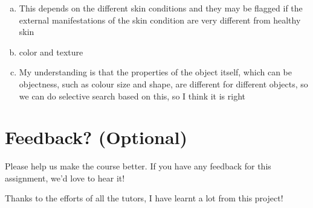  \begin{enumerate}[(a)]

 \item This depends on the different skin conditions and they may be flagged if the external manifestations of the skin condition are very different from healthy skin

 \item color and texture

 \item My understanding is that the properties of the object itself, which can be objectness, such as colour size and shape, are different for different objects, so we can do selective search based on this, so I think it is right

 \end{enumerate}



\pagebreak
\section*{Feedback? (Optional)}
Please help us make the course better. If you have any feedback for this assignment, we'd love to hear it!

Thanks to the efforts of all the tutors, I have learnt a lot from this project!



